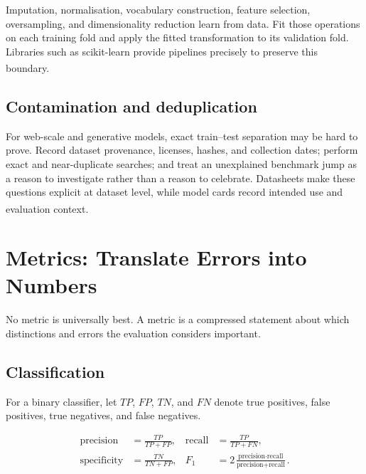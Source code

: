 \begin{cautionbox}
Imputation, normalisation, vocabulary construction, feature selection,
oversampling, and dimensionality reduction learn from data.
Fit those operations on each training fold and apply the fitted transformation
to its validation fold.
Libraries such as scikit-learn provide pipelines precisely to preserve this
boundary.\textsuperscript{\cite{pedregosaScikitlearnMachineLearning2011}}
\end{cautionbox}

\subsection{Contamination and deduplication}

For web-scale and generative models, exact train--test separation may be hard
to prove.
Record dataset provenance, licenses, hashes, and collection dates; perform
exact and near-duplicate searches; and treat an unexplained benchmark jump as
a reason to investigate rather than a reason to celebrate.
Datasheets make these questions explicit at dataset level, while model cards
record intended use and evaluation
context.\textsuperscript{\cite{gebruDatasheetsDatasets2021,
mitchellModelCardsModel2019}}

\section{Metrics: Translate Errors into Numbers}

No metric is universally best.
A metric is a compressed statement about which distinctions and errors the
evaluation considers important.

\subsection{Classification}

For a binary classifier, let $TP$, $FP$, $TN$, and $FN$ denote true positives,
false positives, true negatives, and false negatives.

\begin{align}
    \text{precision} &= \frac{TP}{TP+FP},
    &\text{recall} &= \frac{TP}{TP+FN},
    \label{eq:precision-recall}\\
    \text{specificity} &= \frac{TN}{TN+FP},
    &F_1 &= 2\frac{\text{precision}\cdot\text{recall}}
                    {\text{precision}+\text{recall}}.
    \label{eq:specificity-f1}
\end{align}

